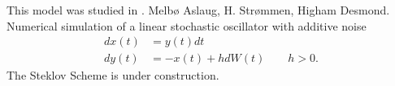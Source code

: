 	This model was studied in \cite{Melbo2004}.
		Melbø Aslaug, H. Strømmen, Higham Desmond. 
		Numerical simulation of a linear stochastic oscillator with additive noise
			\begin{align}
				dx(t) &= y(t)dt\\
				dy(t) &= -x(t)+h dW(t) \qquad h>0.
			\end{align}
		The Steklov Scheme is under construction.
